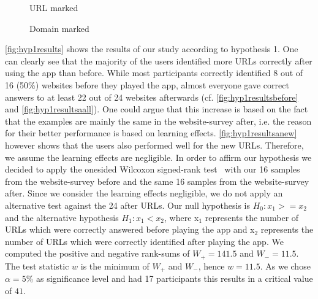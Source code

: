 \begin{figure}
\centering
{}
\caption{URL marked}
\label{fig:hyp2results}
\end{figure}

\begin{figure}
\centering
{}
\caption{Domain marked}
\label{fig:hyp3results}
\end{figure}

\begin{description}[leftmargin=0cm]
\item[Hypothesis 1:]
\autoref{fig:hyp1results} shows the results of our study according to hypothesis 1. One can clearly see that the majority of the users identified more URLs correctly after using the app than before. While most participants correctly identified 8 out of 16 (50\%) websites before they played the app, almost everyone gave correct answers to at least 22 out of 24 websites afterwards (cf. \autoref{fig:hyp1resultsbefore} and \autoref{fig:hyp1resultsaall}). One could argue that this increase is based on the fact that the examples are mainly the same in the website-survey after, i.e. the reason for their better performance is based on learning effects. \autoref{fig:hyp1resultsanew} however shows that the users also performed well for the new URLs. Therefore, we assume the learning effects are negligible.
In order to affirm our hypothesis we decided to apply the onesided Wilcoxon signed-rank test~\cite{wilcoxon1945individual} with our 16 samples from the website-survey before and the same 16 samples from the website-survey after.
Since we consider the learning effects negligible, we do not apply an alternative test against the 24 after URLs.
Our null hypothesis is $H_{0}: x_{1} >= x_{2}$ and the alternative hypothesis $H_{1}: x_{1} < x_{2}$, where x$_{1}$ represents the number of URLs which were correctly answered before playing the app and x$_{2}$ represents the number of URLs which were correctly identified after playing the app.
We computed the positive and negative rank-sums of $W_{+} = 141.5$ and $W_{-} = 11.5$.
The test statistic $w$ is the minimum of $W_{+}$ and $W_{-}$, hence $w = 11.5$.
As we chose $\alpha = 5\%$ as significance level and had 17 participants this results in a critical value of $41$.

\end{description}
